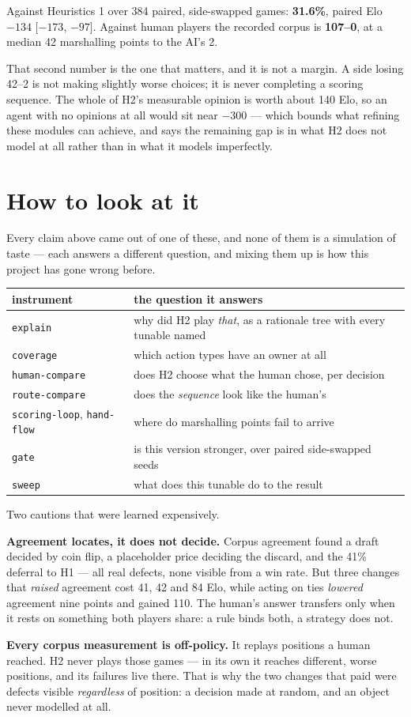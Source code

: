 \documentclass[11pt,a4paper]{article}
\begin{document}
Against Heuristics 1 over 384 paired, side-swapped games: \textbf{31.6\%}, paired
Elo $-134$ [$-173$, $-97$]. Against human players the recorded corpus is
\textbf{107--0}, at a median 42 marshalling points to the AI's 2.

That second number is the one that matters, and it is not a margin. A side
losing 42--2 is not making slightly worse choices; it is never completing a
scoring sequence. The whole of H2's measurable opinion is worth about 140 Elo,
so an agent with no opinions at all would sit near $-300$ --- which bounds what
refining these modules can achieve, and says the remaining gap is in what H2
does not model at all rather than in what it models imperfectly.

\section*{How to look at it}

Every claim above came out of one of these, and none of them is a simulation of
taste --- each answers a different question, and mixing them up is how this
project has gone wrong before.

\begin{center}\small
\begin{tabular}{ll}
\toprule
instrument & the question it answers \\
\midrule
\texttt{explain} & why did H2 play \emph{that}, as a rationale tree with every tunable named \\
\texttt{coverage} & which action types have an owner at all \\
\texttt{human-compare} & does H2 choose what the human chose, per decision \\
\texttt{route-compare} & does the \emph{sequence} look like the human's \\
\texttt{scoring-loop}, \texttt{hand-flow} & where do marshalling points fail to arrive \\
\texttt{gate} & is this version stronger, over paired side-swapped seeds \\
\texttt{sweep} & what does this tunable do to the result \\
\bottomrule
\end{tabular}
\end{center}

Two cautions that were learned expensively.

\textbf{Agreement locates, it does not decide.} Corpus agreement found a draft
decided by coin flip, a placeholder price deciding the discard, and the 41\%
deferral to H1 --- all real defects, none visible from a win rate. But three
changes that \emph{raised} agreement cost 41, 42 and 84 Elo, while acting
on ties \emph{lowered} agreement nine points and gained 110. The human's answer
transfers only when it rests on something both players share: a rule binds both,
a strategy does not.

\textbf{Every corpus measurement is off-policy.} It replays positions a human
reached. H2 never plays those games --- in its own it reaches different, worse
positions, and its failures live there. That is why the two changes that paid
were defects visible \emph{regardless} of position: a decision made at random,
and an object never modelled at all.
\end{document}
